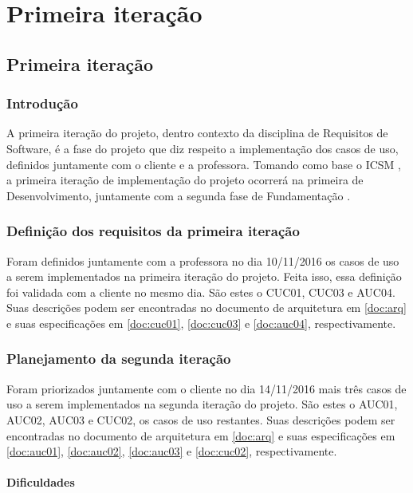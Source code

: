 \part{Primeira iteração}
\chapter[Primeira iteração]{Primeira iteração}

\section{Introdução}

A primeira iteração do projeto, dentro contexto da disciplina de Requisitos de Software, é a fase do projeto que diz respeito a implementação dos casos de uso, definidos juntamente com o cliente e a professora. Tomando como base o ICSM \cite{boehmincremental}, a primeira iteração de implementação do projeto ocorrerá na primeira de Desenvolvimento, juntamente com a segunda fase de Fundamentação \cite{boehmincremental}.

\section{Definição dos requisitos da primeira iteração}

Foram definidos juntamente com a professora no dia 10/11/2016 os casos de uso a serem implementados na primeira iteração do projeto. Feita isso, essa definição foi validada com a cliente no mesmo dia. São estes o CUC01, CUC03 e AUC04. Suas descrições podem ser encontradas no documento de arquitetura em \ref{doc:arq} e suas especificações em \ref{doc:cuc01}, \ref{doc:cuc03} e \ref{doc:auc04}, respectivamente.

\section{Planejamento da segunda iteração}

Foram priorizados juntamente com o cliente no dia 14/11/2016 mais três casos de uso a serem implementados na segunda iteração do projeto. São estes o AUC01, AUC02, AUC03 e CUC02, os casos de uso restantes. Suas descrições podem ser encontradas no documento de arquitetura em \ref{doc:arq} e suas especificações em \ref{doc:auc01}, \ref{doc:auc02}, \ref{doc:auc03} e \ref{doc:cuc02}, respectivamente.

\subsection{Dificuldades}

